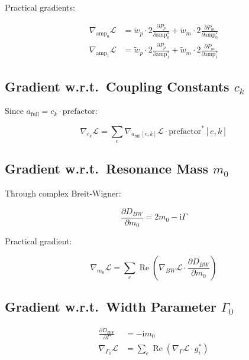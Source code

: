 \documentclass[12pt,a4paper]{article}
\newcommand{\ii}{\mathrm{i}}
\begin{document}
Practical gradients:

\begin{align}
\nabla_{\text{amp}_0} \mathcal{L} &= \tilde{w}_p \cdot 2 \frac{\partial P_p}{\partial \text{amp}_0^*} + \tilde{w}_m \cdot 2 \frac{\partial P_m}{\partial \text{amp}_0^*} \\
\nabla_{\text{amp}_1} \mathcal{L} &= \tilde{w}_p \cdot 2 \frac{\partial P_p}{\partial \text{amp}_1^*} + \tilde{w}_m \cdot 2 \frac{\partial P_m}{\partial \text{amp}_1^*}
\end{align}

\subsection{Gradient w.r.t.\ Coupling Constants $c_k$}

Since $a_{\text{full}} = c_k \cdot \text{prefactor}$:

\begin{equation}
\nabla_{c_k} \mathcal{L} = \sum_e \nabla_{a_{\text{full}}[e,k]} \mathcal{L} \cdot \text{prefactor}^*[e,k]
\end{equation}

\subsection{Gradient w.r.t.\ Resonance Mass $m_0$}

Through complex Breit-Wigner:

\begin{equation}
\frac{\partial D_{BW}}{\partial m_0} = 2m_0 - \ii \Gamma
\end{equation}

Practical gradient:

\begin{equation}
\nabla_{m_0} \mathcal{L} = \sum_e \operatorname{Re}\!\left(\nabla_{BW} \mathcal{L} \cdot \overline{\frac{\partial D_{BW}}{\partial m_0}}\right)
\end{equation}

\subsection{Gradient w.r.t.\ Width Parameter $\Gamma_0$}

\begin{align}
\frac{\partial D_{BW}}{\partial \Gamma} &= -\ii m_0 \\
\nabla_{\Gamma_0} \mathcal{L} &= \sum_e \operatorname{Re}\!\left(\nabla_\Gamma \mathcal{L} \cdot g_i^*\right)
\end{align}
\end{document}
